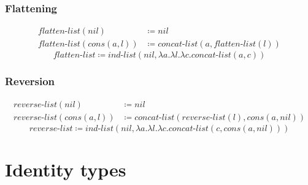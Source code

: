\documentclass{article}
\begin{document}
\subsubsection{Flattening}
\begin{align}
    flatten\text{-}list(nil) &\coloneqq nil\\
    flatten\text{-}list(cons(a,l)) &\coloneqq concat\text{-}list(a,flatten\text{-}list(l))
\end{align}
$$
    flatten\text{-}list \coloneqq ind\text{-}list(nil,\lambda a.\lambda l.\lambda c.concat\text{-}list(a, c))
$$
\subsubsection{Reversion}
\begin{align}
    reverse\text{-}list(nil) &\coloneqq nil\\
    reverse\text{-}list(cons(a,l)) &\coloneqq concat\text{-}list(reverse\text{-}list(l),cons(a,nil))
\end{align}
$$
    reverse\text{-}list \coloneqq ind\text{-}list(nil,\lambda a.\lambda l.\lambda c.concat\text{-}list(c,cons(a,nil)))
$$
\section{Identity types}
\end{document}
